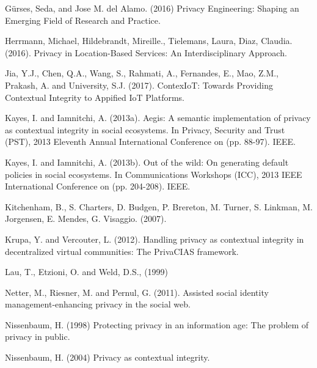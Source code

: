 \documentclass[../thesis.tex]{subfiles}
\begin{document}
\bigskip

G\"urses, Seda, and
Jose M. del Alamo. (2016) Privacy Engineering: Shaping
an Emerging Field of Research and Practice.
\cite{gurses2016privacy}

\bigskip

Herrmann, Michael,
Hildebrandt, Mireille., Tielemans, Laura, Diaz, Claudia. (2016).
Privacy in Location-Based Services: An Interdisciplinary Approach.
\cite{herrmann2016privacy}


\bigskip

Jia, Y.J., Chen, Q.A., Wang, S., Rahmati, A., Fernandes, E., Mao, Z.M.,
Prakash, A. and University, S.J. (2017). ContexIoT: Towards Providing
Contextual Integrity to Appified IoT Platforms.
\cite{jia2017contexiot}

\bigskip

Kayes, I. and Iamnitchi, A. (2013a). Aegis: A semantic implementation of
privacy as contextual integrity in social ecosystems. In Privacy,
Security and Trust (PST), 2013 Eleventh Annual International Conference
on (pp. 88-97). IEEE.
\cite{kayes2013aegis}

\bigskip

Kayes, I. and Iamnitchi, A. (2013b). Out of the wild: On generating
default policies in social ecosystems. In Communications Workshops
(ICC), 2013 IEEE International Conference on (pp. 204-208). IEEE.
\cite{kayes2013out}

\bigskip

Kitchenham, B., S. Charters, D. Budgen, P. Brereton, M. Turner, S.
Linkman, M. Jorgensen, E. Mendes, G. Visaggio. (2007).
\cite{kitchenham2007guidelines}

Krupa, Y. and Vercouter, L. (2012). Handling privacy as contextual
integrity in decentralized virtual communities: The PrivaCIAS
framework. 
\cite{krupa2012handling}


\bigskip

Lau, T., Etzioni, O.
and Weld, D.S., (1999) \cite{lau1999privacy}

Netter, M., Riesner, M. and Pernul, G. (2011). Assisted social identity
management-enhancing privacy in the social web.
\cite{netter2011assisted}


\bigskip

Nissenbaum, H. (1998)
Protecting privacy in an information age: The problem of
privacy in public. \cite{nissenbaum1998protecting}

Nissenbaum, H. (2004)
Privacy as contextual integrity.
\cite{nissenbaum2004privacy}
\end{document}
